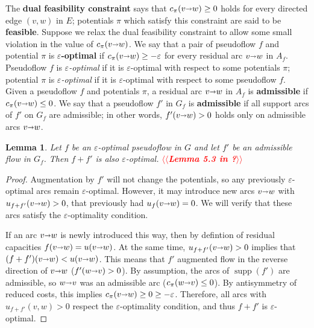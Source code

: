 \documentclass[11pt]{article}
\makeatletter
\def\eps{\varepsilon}
\def\arcto{\mathord\shortrightarrow}
\def\arc#1#2{#1\arcto#2}
\def\supp{\operatorname{supp}}
\theoremstyle{plain}
\newtheorem{lemma}{Lemma}[section]
\numberwithin{figure}{section}
\def\EMPH#1{\textbf{\boldmath #1}}
\def\n@te#1{\textsf{\boldmath \textbf{$\langle\!\langle$#1$\rangle\!\rangle$}}\leavevmode}
\def\note#1{\textcolor{red}{\n@te{#1}}}
\makeatother
\begin{document}
The \EMPH{dual feasibility constraint} says that $c_\pi(\arc vw) \geq 0$ holds for every directed edge $(v,w)$ in $E$; potentials $\pi$ which satisfy this constraint are said to be \EMPH{feasible}.
%
%
Suppose we relax the dual feasibility constraint to allow some small violation in the value of $c_\pi(\arc vw)$.
We say that a pair of pseudoflow $f$ and potential $\pi$ is \EMPH{$\eps$-optimal} \cite{tar-spmcc-1985,be-darml-1987} if
$c_\pi(\arc vw) \geq -\eps$ for every residual arc $\arc vw$ in $A_f$.  Pseudoflow $f$ is \emph{$\eps$-optimal} if it is $\eps$-optimal with respect to some potentials $\pi$; potential $\pi$ is \emph{$\eps$-optimal} if it is $\eps$-optimal with respect to some pseudoflow $f$.
%
Given a pseudoflow $f$ and potentials $\pi$, a residual arc $\arc vw$ in $A_f$ is
\EMPH{admissible} if $c_\pi(\arc vw) \leq 0$.
We say that a pseudoflow $f'$ in $G_f$ is \EMPH{admissible} if all support arcs of $f'$ on $G_f$ are admissible; in other words, $f'(\arc vw) > 0$ holds
only on admissible arcs $\arc vw$.

\begin{lemma}
Let $f$ be an $\eps$-optimal pseudoflow in $G$ and let $f'$ be an
admissible flow in $G_f$.
Then $f + f'$ is also $\eps$-optimal.
\note{Lemma 5.3 in \cite{GT90}?}
\end{lemma}

\begin{proof}
Augmentation by $f'$ will not change the potentials, so any previously
$\eps$-optimal arcs remain $\eps$-optimal.
However, it may introduce new arcs $\arc vw$ with $u_{f+f'}(\arc vw) > 0$, that previously had
$u_f(\arc vw) = 0$.
We will verify that these arcs satisfy the $\eps$-optimality condition.

If an arc $\arc vw$ is newly introduced this way, then by defintion of residual
capacities $f(\arc vw) = u(\arc vw)$.
At the same time, $u_{f+f'}(\arc vw) > 0$ implies that $(f+f')(\arc vw) < u(\arc vw)$.
This means that $f'$ augmented flow in the reverse direction of $\arc vw$
($f'(\arc wv) > 0$).
By assumption, the arcs of $\supp(f')$ are admissible, so $\arc wv$ was an
admissible arc ($c_\pi(\arc wv) \leq 0$).
By antisymmetry of reduced costs, this implies $c_\pi(\arc vw) \geq 0 \geq -\eps$.
Therefore, all arcs with $u_{f+f'}(v, w) > 0$ respect the $\eps$-optimality condition,
and thus $f+f'$ is $\eps$-optimal.
\end{proof}
\end{document}
